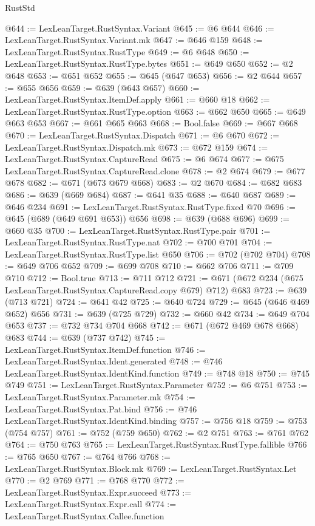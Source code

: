 \begin{lexlean}{RustStd}
\begin{coremodule}
@644 := LexLeanTarget.RustSyntax.Variant
@645 := @6 @644
@646 := LexLeanTarget.RustSyntax.Variant.mk
@647 := @646 @159
@648 := LexLeanTarget.RustSyntax.RustType
@649 := @6 @648
@650 := LexLeanTarget.RustSyntax.RustType.bytes
@651 := @649 @650
@652 := @2 @648
@653 := @651 @652
@655 := @645 (@647 @653)
@656 := @2 @644
@657 := @655 @656
@659 := @639 (@643 @657)
@660 := LexLeanTarget.RustSyntax.ItemDef.apply
@661 := @660 @18
@662 := LexLeanTarget.RustSyntax.RustType.option
@663 := @662 @650
@665 := @649 @663 @653
@667 := @661 @665 @663
@668 := Bool.false
@669 := @667 @668
@670 := LexLeanTarget.RustSyntax.Dispatch
@671 := @6 @670
@672 := LexLeanTarget.RustSyntax.Dispatch.mk
@673 := @672 @159
@674 := LexLeanTarget.RustSyntax.CaptureRead
@675 := @6 @674
@677 := @675 LexLeanTarget.RustSyntax.CaptureRead.clone
@678 := @2 @674
@679 := @677 @678
@682 := @671 (@673 @679 @668)
@683 := @2 @670
@684 := @682 @683
@686 := @639 (@669 @684)
@687 := @641 @35
@688 := @640 @687
@689 := @646 @234
@691 := LexLeanTarget.RustSyntax.RustType.fixed @70
@696 := @645 (@689 (@649 @691 @653)) @656
@698 := @639 (@688 @696)
@699 := @660 @35
@700 := LexLeanTarget.RustSyntax.RustType.pair
@701 := LexLeanTarget.RustSyntax.RustType.nat
@702 := @700 @701
@704 := LexLeanTarget.RustSyntax.RustType.list @650
@706 := @702 (@702 @704)
@708 := @649 @706 @652
@709 := @699 @708
@710 := @662 @706
@711 := @709 @710
@712 := Bool.true
@713 := @711 @712
@721 := @671 (@672 @234 (@675 LexLeanTarget.RustSyntax.CaptureRead.copy @679) @712) @683
@723 := @639 (@713 @721)
@724 := @641 @42
@725 := @640 @724
@729 := @645 (@646 @469 @652) @656
@731 := @639 (@725 @729)
@732 := @660 @42
@734 := @649 @704 @653
@737 := @732 @734 @704 @668
@742 := @671 (@672 @469 @678 @668) @683
@744 := @639 (@737 @742)
@745 := LexLeanTarget.RustSyntax.ItemDef.function
@746 := LexLeanTarget.RustSyntax.Ident.generated
@748 := @746 LexLeanTarget.RustSyntax.IdentKind.function
@749 := @748 @18
@750 := @745 @749
@751 := LexLeanTarget.RustSyntax.Parameter
@752 := @6 @751
@753 := LexLeanTarget.RustSyntax.Parameter.mk
@754 := LexLeanTarget.RustSyntax.Pat.bind
@756 := @746 LexLeanTarget.RustSyntax.IdentKind.binding
@757 := @756 @18
@759 := @753 (@754 @757)
@761 := @752 (@759 @650)
@762 := @2 @751
@763 := @761 @762
@764 := @750 @763
@765 := LexLeanTarget.RustSyntax.RustType.fallible
@766 := @765 @650
@767 := @764 @766
@768 := LexLeanTarget.RustSyntax.Block.mk
@769 := LexLeanTarget.RustSyntax.Let
@770 := @2 @769
@771 := @768 @770
@772 := LexLeanTarget.RustSyntax.Expr.succeed
@773 := LexLeanTarget.RustSyntax.Expr.call
@774 := LexLeanTarget.RustSyntax.Callee.function

\end{coremodule}
\end{lexlean}
